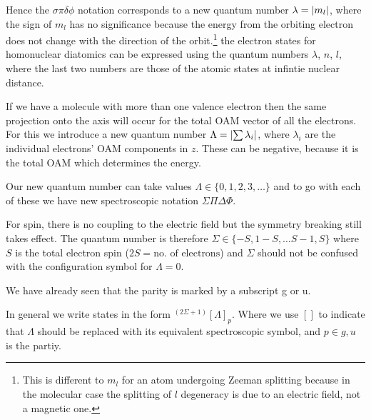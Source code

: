 Hence the $\sigma\pi\delta\phi$ notation corresponds to a new quantum number
$\lambda = \abs{m_l}$, where the sign of $m_l$ has no significance because the
energy from the orbiting electron does not change with the direction of the
orbit.\footnote{This is different to $m_l$ for an atom undergoing Zeeman
splitting because in the molecular case the splitting of $l$ degeneracy is due
to an electric field, not a magnetic one.} 
%
 the electron states for homonuclear diatomics
can be expressed using the quantum numbers $\lambda$, $n$, $l$, where the last
two numbers are those of the atomic states at infintie nuclear distance.


If we have a molecule with more than one valence electron then the same
projection onto the axis will occur for the total OAM vector of all the
electrons. For this we introduce a new quantum number $\Lambda =
\abs{\sum{\lambda_i}}$, where $\lambda_i$ are the individual electrons' OAM
components in $z$. These can be negative, because it is the total OAM which
determines the energy.


Our new quantum number can take values $\Lambda \in \{0,1,2,3,\ldots\}$ and to
go with each of these we have new spectroscopic notation $\Sigma\Pi\Delta\Phi$.

For spin, there is no coupling to the electric field but the symmetry breaking
still takes effect. The quantum number is therefore $\Sigma \in \{-S, 1-S,\ldots
S-1, S\}$ where $S$ is the total electron spin ($2S = \text{no. of electrons}$)
and $\Sigma$ should not be confused with the configuration symbol for $\Lambda =
0$.


We have already seen that the parity is marked by a subscript g or u.

In general we write states in the form $^{(2\Sigma + 1)}[\Lambda]_{p}$. Where we
use $[]$ to indicate that $\Lambda$ should be replaced with its equivalent
spectroscopic symbol, and $p \in {g, u}$ is the partiy.
%



